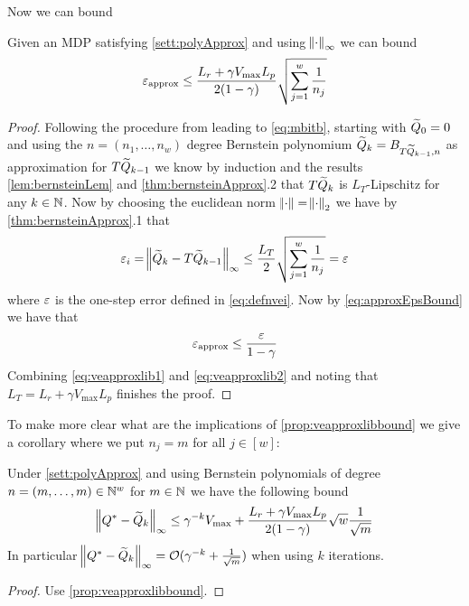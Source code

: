 Now we can bound

\begin{prop}
  Given an MDP satisfying \cref{sett:polyApprox} and using $\norm{\cdot}_\infty$
  we can bound
  \[ \varepsilon_{\mathrm{approx}} \leq \frac{L_r + \gamma V_{\max} L_p}{2(1-\gamma)}
  \sqrt{\sum_{j=1}^w \frac{1}{n_j}} \]
  \label{prop:veapproxlibbound}
\end{prop}
\begin{proof}
  Following the procedure from leading to \cref{eq:mbitb},
  starting with $\widetilde{Q}_0 = 0$
  and using the $n = (n_1, \dots, n_w)$ degree Bernstein polynomium
  $\widetilde{Q}_{k} = B_{T\widetilde{Q}_{k-1}, n}$ as approximation for $T\widetilde{Q}_{k-1}$
  we know by induction and
  the results \cref{lem:bernsteinLem}
  and \cref{thm:bernsteinApprox}.2 that $T\widetilde{Q}_k$ is
  $L_T$-Lipschitz for any $k \in \mathbb{N}$.
  Now by choosing the euclidean norm $\norm{\cdot} = \norm{\cdot}_2$
  we have by \cref{thm:bernsteinApprox}.1 that
  \begin{equation}
    \varepsilon_i = \norm{\widetilde{Q}_k - T\widetilde{Q}_{k-1}}_\infty
    \leq \frac{L_T}{2} \sqrt{\sum_{j=1}^w \frac{1}{n_j}} = \varepsilon
    \label{eq:veapproxlib1}
  \end{equation}
  where $\varepsilon$ is the one-step error defined in \cref{eq:defnvei}.
  Now by \cref{eq:approxEpsBound}
  we have that
  \begin{equation}
    \varepsilon_{\mathrm{approx}} \leq \frac{\varepsilon}{1-\gamma}
    \label{eq:veapproxlib2}
  \end{equation}
  Combining \cref{eq:veapproxlib1} and \cref{eq:veapproxlib2} and noting
  that $L_T = L_r + \gamma V_{\max} L_p$ finishes the proof.
\end{proof}

To make more clear what are the implications of \cref{prop:veapproxlibbound}
we give a corollary where we put $n_j = m$ for all $j \in [w]$:

\begin{cor}
  Under \cref{sett:polyApprox} and using Bernstein polynomials of degree
  $n = (m, \dots, m) \in \mathbb{N}^w$ for $m \in \mathbb{N}$ we have the following bound
  \[ \norm{Q^* - \widetilde{Q}_k}_\infty \leq \gamma^{-k} V_{\max}
    + \frac{L_r + \gamma V_{\max} L_p}{2(1-\gamma)} \sqrt{w}
  \frac{1}{\sqrt{m}} \]
  In particular $\norm{Q^* - \widetilde{Q}_k}_\infty
  = \mathcal{O}(\gamma^{-k} + \frac{1}{\sqrt{m}})$
  when using $k$ iterations.
  \label{cor:libbound}
\end{cor}
\begin{proof}
  Use \cref{prop:veapproxlibbound}.
\end{proof}

